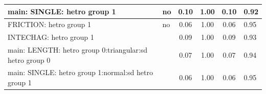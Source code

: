 \begin{table}
\begin{center}
\begin{tabular}{|l|l|c|c|c|l|}
			\hline
			main: SINGLE: hetro group 1 & no & 0.10 & 1.00 & 0.10 & 0.92 \\
			\hline
			FRICTION: hetro group 1 & no & 0.06 & 1.00 & 0.06 & 0.95 \\
			\hline
			INTECHAG: hetro group 1 &  & 0.09 & 1.00 & 0.09 & 0.93 \\
			\hline
			main: LENGTH: hetro group 0:triangular:sd  hetro group 0 &  & 0.07 & 1.00 & 0.07 & 0.94 \\
			\hline
			main: SINGLE: hetro group 1:normal:sd  hetro group 1 &  & 0.06 & 1.00 & 0.06 & 0.95 \\
			\hline
		\end{tabular}
	\end{center}
\end{table}
